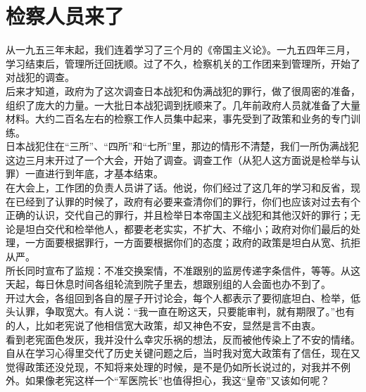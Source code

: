 \fancyhead[RO]{\thepage} %
\fancyhead[LE]{\thepage} %
\chapter*{检察人员来了}
 从一九五三年末起，我们连着学习了三个月的《帝国主义论》。一九五四年三月，学习结束后，管理所迁回抚顺。过了不久，检察机关的工作团来到管理所，开始了对战犯的调查。\\

后来才知道，政府为了这次调查日本战犯和伪满战犯的罪行，做了很周密的准备，组织了庞大的力量。一大批日本战犯调到抚顺来了。几年前政府人员就准备了大量材料。大约二百名左右的检察工作人员集中起来，事先受到了政策和业务的专门训练。\\

日本战犯住在“三所”、“四所”和“七所”里，那边的情形不清楚，我们一所伪满战犯这边三月末开过了一个大会，开始了调查。调查工作（从犯人这方面说是检举与认罪）一直进行到年底，才基本结束。\\

在大会上，工作团的负责人员讲了话。他说，你们经过了这几年的学习和反省，现在已经到了认罪的时候了，政府有必要来查清你们的罪行，你们也应该对过去有个正确的认识，交代自己的罪行，并且检举日本帝国主义战犯和其他汉奸的罪行；无论是坦白交代和检举他人，都要老老实实，不扩大、不缩小；政府对你们最后的处理，一方面要根据罪行，一方面要根据你们的态度；政府的政策是坦白从宽、抗拒从严。\\

所长同时宣布了监规：不准交换案情，不准跟别的监房传递字条信件，等等。从这天起，每日休息时间各组轮流到院子里去，想跟别组的人会面也办不到了。\\

开过大会，各组回到各自的屋子开讨论会，每个人都表示了要彻底坦白、检举，低头认罪，争取宽大。有人说：“我一直在盼这天，只要能审判，就有期限了。”也有的人，比如老宪说了他相信宽大政策，却又神色不安，显然是言不由衷。\\

看到老宪面色发灰，我并没什么幸灾乐祸的想法，反而被他传染上了不安的情绪。自从在学习心得里交代了历史关键问题之后，当时我对宽大政策有了信任，现在又觉得政策还没兑现，不知将来处理的时候，是不是仍如所长说过的，对我并不例外。如果像老宪这样一个“军医院长”也值得担心，我这“皇帝”又该如何呢？\\

